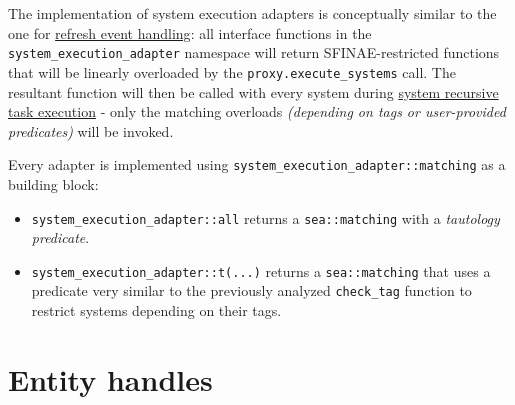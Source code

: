 \documentclass[twoside, 12pt, a4paper, openany]{book}
\begin{document}
The implementation of system execution adapters is conceptually similar
to the one for \protect\hyperlink{advf_refresh_event_handling}{refresh
event handling}: all interface functions in the
\texttt{system_execution_adapter}
namespace will return SFINAE-restricted functions that will be linearly
overloaded by the
\texttt{proxy.execute_systems}
call. The resultant function will then be called with every system
during
\protect\hyperlink{multithreading_recursive_task_execution}{system
recursive task execution} - only the matching overloads \emph{(depending
on tags or user-provided predicates)} will be invoked.

Every adapter is implemented using
\texttt{system_execution_adapter::matching}
as a building block:

\begin{itemize}
\item
  \texttt{system_execution_adapter::all}
  returns a
  \texttt{sea::matching}
  with a \emph{tautology predicate}.
\item
  \texttt{system_execution_adapter::t(...)}
  returns a
  \texttt{sea::matching}
  that uses a predicate very similar to the previously analyzed
  \texttt{check_tag}
  function to restrict systems depending on their tags.
\end{itemize}

\section{Entity handles}\label{entity-handles}
\end{document}
